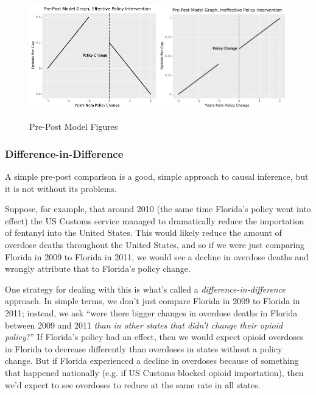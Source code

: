 \documentclass[12pt]{article}
\begin{document}
\begin{figure}[h!]
  \centering
  \caption{Pre-Post Model Figures}\label{figure_prepost_examples}
  \includegraphics[width=0.5\textwidth]{images/prepost_successful.pdf}\includegraphics[width=0.5\textwidth]{images/prepost_failed.pdf}
\end{figure}
\pagebreak
\subsubsection*{Difference-in-Difference}

A simple pre-post comparison is a good, simple approach to causal inference, but it is not without its problems.

Suppose, for example, that around 2010 (the same time Florida's policy went into effect) the US Customs service managed to dramatically reduce the importation of fentanyl into the United States. This would likely reduce the amount of overdose deaths throughout the United States, and so if we were just comparing Florida in 2009 to Florida in 2011, we would see a decline in overdose deaths and wrongly attribute that to Florida's policy change.

One strategy for dealing with this is what's called a \emph{difference-in-difference} approach. In simple terms, we don't just compare Florida in 2009 to Florida in 2011; instead, we ask ``were there bigger changes in overdose deaths in Florida between 2009 and 2011 \emph{than in other states that didn't change their opioid policy}?'' If Florida's policy had an effect, then we would expect opioid overdoses in Florida to decrease differently than overdoses in states without a policy change. But if Florida experienced a decline in overdoses because of something that happened nationally (e.g. if US Customs blocked opioid importation), then we'd expect to see overdoses to reduce at the same rate in all states.
\end{document}
